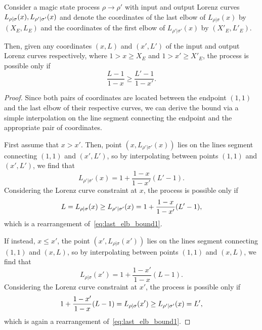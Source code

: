 \documentclass[pra,
aps,
twocolumn,
superscriptaddress,
groupedaddress,
nofootinbib,
reprint
]{revtex4-1}
\begin{document}
\begin{proposition}\label{prop:last_elb}
	Consider a magic state process $\rho \longrightarrow \rho'$ with input and output Lorenz curves ${L_{\rho|\sigma}}(x), {L_{\rho'|\sigma'}}(x)$ and denote the coordinates of the last elbow of $L_{\rho|\sigma}(x)$ by $(X_E, L_E)$ and the coordinates of the first elbow of $L_{\rho' |\sigma'}(x)$ by $(X'_E, L'_E)$.
	
Then, given any coordinates $(x, L)$ and $(x', L')$ of the input and output Lorenz curves respectively, where $1 > x \geq X_E$ and $1 > x' \geq X'_E$, the process is possible only if
\begin{equation}\label{eq:last_elb_bound1}
	\frac{L - 1}{1-x} \geq \frac{L' - 1}{1-x'}.
\end{equation}
\end{proposition}
\begin{proof}
Since both pairs of coordinates are located between the endpoint $(1,1)$ and the last elbow of their respective curves, we can derive the bound via a simple interpolation on the line segment connecting the endpoint and the appropriate pair of coordinates.

First assume that $x > x'$.
Then, point $(x, L_{\rho'|\sigma'}(x))$ lies on the lines segment connecting $(1,1)$ and $(x', L')$, so by interpolating between points $(1,1)$ and $(x', L')$, we find that
\begin{equation}
	L_{\rho'|\sigma'}(x) = 1 + \frac{1-x}{1-x'} (L' - 1).
\end{equation}
Considering the Lorenz curve constraint at $x$, the process is possible only if 
\begin{equation}
	L = {L_{\rho|\sigma}}(x) \geq {L_{\rho'|\sigma'}}(x) = 1 + \frac{1-x}{1-x'} (L' - 1),
\end{equation}
which is a rearrangement of~\cref{eq:last_elb_bound1}.

If instead, $x \leq x'$, the point $(x', L_{\rho|\sigma}(x'))$ lies on the lines segment connecting $(1,1)$ and $(x, L)$, so by interpolating between points $(1,1)$ and $(x, L)$, we find that
\begin{equation}
	L_{\rho|\sigma}(x') = 1 + \frac{1-x'}{1-x} (L - 1).
\end{equation}
Considering the Lorenz curve constraint at $x'$, the process is possible only if 
\begin{equation}
	1 + \frac{1-x'}{1-x} (L - 1) = {L_{\rho|\sigma}}(x') \geq {L_{\rho'|\sigma'}}(x) = L',
\end{equation}
which is again a rearrangement of~\cref{eq:last_elb_bound1}.
\end{proof}
\end{document}
